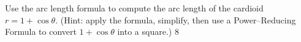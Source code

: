 {Use the arc length formula to compute the arc length of the cardioid $r=1+\cos\theta$. (Hint: apply the formula, simplify, then use a Power--Reducing Formula to convert $1+\cos \theta$ into a square.)
}
{$8$
}
